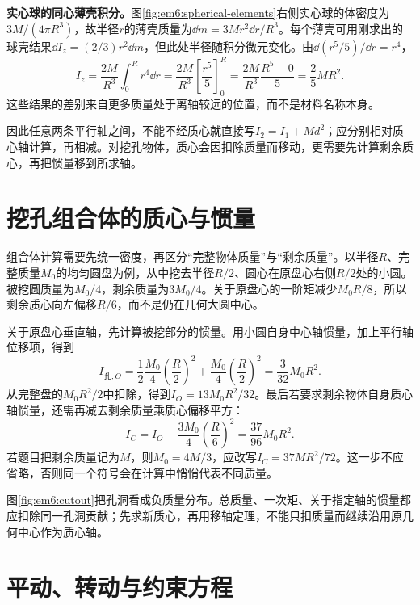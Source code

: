 \textbf{实心球的同心薄壳积分。}图\ref{fig:em6:spherical-elements}右侧实心球的体密度为$3M/(4\pi R^3)$，故半径$r$的薄壳质量为$\dd m=3Mr^2\dd r/R^3$。每个薄壳可用刚求出的球壳结果$\dd I_z=(2/3)r^2\dd m$，但此处半径随积分微元变化。由$\dd(r^5/5)/\dd r=r^4$，
\[
 I_z=\frac{2M}{R^3}\int_0^R r^4\dd r
 =\frac{2M}{R^3}\left[\frac{r^5}{5}\right]_0^R
 =\frac{2M}{R^3}\frac{R^5-0}{5}=\frac25MR^2.
\]
这些结果的差别来自更多质量处于离轴较远的位置，而不是材料名称本身。

因此任意两条平行轴之间，不能不经质心就直接写$I_2=I_1+Md^2$；应分别相对质心轴计算，再相减。对挖孔物体，质心会因扣除质量而移动，更需要先计算剩余质心，再把惯量移到所求轴。

\section{挖孔组合体的质心与惯量}

组合体计算需要先统一密度，再区分“完整物体质量”与“剩余质量”。以半径$R$、完整质量$M_0$的均匀圆盘为例，从中挖去半径$R/2$、圆心在原盘心右侧$R/2$处的小圆。被挖圆质量为$M_0/4$，剩余质量为$3M_0/4$。关于原盘心的一阶矩减少$M_0R/8$，所以剩余质心向左偏移$R/6$，而不是仍在几何大圆中心。

关于原盘心垂直轴，先计算被挖部分的惯量。用小圆自身中心轴惯量，加上平行轴位移项，得到
\[I_{\text{孔},O}=\frac12\frac{M_0}{4}\left(\frac R2\right)^2+\frac{M_0}{4}\left(\frac R2\right)^2=\frac3{32}M_0R^2.\]
从完整盘的$M_0R^2/2$中扣除，得到$I_O=13M_0R^2/32$。最后若要求剩余物体自身质心轴惯量，还需再减去剩余质量乘质心偏移平方：
\[I_C=I_O-\frac{3M_0}{4}\left(\frac R6\right)^2=\frac{37}{96}M_0R^2.\]
若题目把剩余质量记为$M$，则$M_0=4M/3$，应改写$I_C=37MR^2/72$。这一步不应省略，否则同一个符号会在计算中悄悄代表不同质量。


图\ref{fig:em6:cutout}把孔洞看成负质量分布。总质量、一次矩、关于指定轴的惯量都应扣除同一孔洞贡献；先求新质心，再用移轴定理，不能只扣质量而继续沿用原几何中心作为质心轴。

\section{平动、转动与约束方程}

